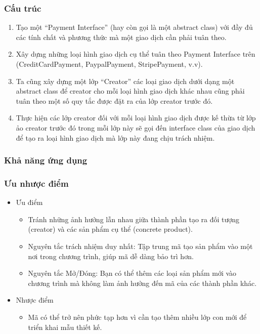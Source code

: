 \subsubsection{Cấu trúc}
\begin{flushleft}
    \begin{enumerate}
        \item Tạo một “Payment Interface” (hay còn gọi là một abstract class) với đầy đủ các tính chất và phương thức mà một giao dịch cần phải tuân theo.
        \item Xây dựng những loại hình giao dịch cụ thể tuân theo Payment Interface trên (CreditCardPayment, PaypalPayment, StripePayment, v.v).
        \item Ta cũng xây dựng một lớp “Creator” các loại giao dịch dưới dạng một abstract class để creator cho mỗi loại hình giao dịch khác nhau cũng phải tuân theo một số quy tắc được đặt ra của lớp creator trước đó.
        \item Thực hiện các lớp creator đối với mỗi loại hình giao dịch được kế thừa từ lớp ảo creator trước đó trong mỗi lớp này sẽ gọi đến interface class của giao dịch để tạo ra loại hình giao dịch mà lớp này đang chịu trách nhiệm.
    \end{enumerate}
\end{flushleft}

\subsubsection{Khả năng ứng dụng}
\begin{flushleft}
\end{flushleft}

\subsubsection{Ưu nhược điểm}
\begin{flushleft}
    \begin{itemize}
        \item Ưu điểm
              \begin{itemize}
                  \item Tránh những ảnh hưởng lẫn nhau giữa thành phần tạo ra đối tượng (creator) và các sản phẩm cụ thể (concrete product).
                  \item Nguyên tắc trách nhiệm duy nhất: Tập trung mã tạo sản phẩm vào một nơi trong chương trình, giúp mã dễ dàng bảo trì hơn.
                  \item Nguyên tắc Mở/Đóng: Bạn có thể thêm các loại sản phẩm mới vào chương trình mà không làm ảnh hưởng đến mã của các thành phần khác.
              \end{itemize}
        \item Nhược điểm
              \begin{itemize}
                  \item Mã có thể trở nên phức tạp hơn vì cần tạo thêm nhiều lớp con mới để triển khai mẫu thiết kế.
              \end{itemize}
    \end{itemize}
\end{flushleft}
